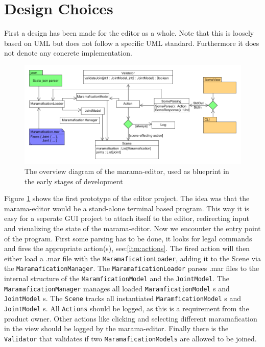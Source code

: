 \documentclass[10pt]{extarticle} %
\newcommand{\code}[1]{\texttt{#1}} %
\begin{document}
    \section{Design Choices}
    \label{sec:designchoices}

    First a design has been made for the editor as a whole.
    Note that this is loosely based on UML but does not follow a specific UML standard.
    Furthermore it does not denote any concrete implementation.\\
    \begin{figure}[htb]
        \centering
        \includegraphics[width=\textwidth, height=\textheight, keepaspectratio]{architecture-marama-editor}
        \caption{The overview diagram of the marama-editor, used as blueprint in the early stages of development}
        \label{fig:ame}
    \end{figure}
    Figure \ref{fig:ame} shows the first prototype of the editor project.
    The idea was that the marama-editor would be a stand-alone terminal based program.
    This way it is easy for a seperate GUI project to attach itself to the editor, redirecting input and visualizing the state of the marama-editor.
    Now we encounter the entry point of the program.
    First some parsing has to be done, it looks for legal commands and fires the appropriate action(s), see:\ref{itm:actions}.
    The fired action will then either load a .mar file with the \code{MaramaficationLoader}, adding it to the Scene via the \code{MaramaficationManager}.
    The \code{MaramaficationLoader} parses .mar files to the internal structure of the \code{MaramficationModel} and the \code{JointModel}.
    The \code{MaramaficationManager} manages all loaded \code{MaramficationModel} s and \code{JointModel} s.
    The \code{Scene} tracks all instantiated \code{MaramficationModel} s and \code{JointModel} s.
    All \code{Actions} should be logged, as this is a requirement from the product owner.
    Other actions like clicking and selecting different maramafication in the view should be logged by the marama-editor.
    Finally there is the \code{Validator} that validates if two \code{MaramaficationModels} are allowed to be joined.
\end{document}
